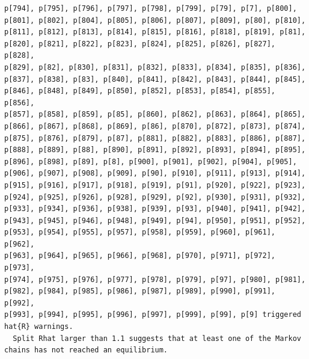 \documentclass[
  letterpaper,
  DIV=11,
  numbers=noendperiod]{scrartcl}
\begin{document}
\begin{verbatim}
p[794], p[795], p[796], p[797], p[798], p[799], p[79], p[7], p[800],
p[801], p[802], p[804], p[805], p[806], p[807], p[809], p[80], p[810],
p[811], p[812], p[813], p[814], p[815], p[816], p[818], p[819], p[81],
p[820], p[821], p[822], p[823], p[824], p[825], p[826], p[827], p[828],
p[829], p[82], p[830], p[831], p[832], p[833], p[834], p[835], p[836],
p[837], p[838], p[83], p[840], p[841], p[842], p[843], p[844], p[845],
p[846], p[848], p[849], p[850], p[852], p[853], p[854], p[855], p[856],
p[857], p[858], p[859], p[85], p[860], p[862], p[863], p[864], p[865],
p[866], p[867], p[868], p[869], p[86], p[870], p[872], p[873], p[874],
p[875], p[876], p[879], p[87], p[881], p[882], p[883], p[886], p[887],
p[888], p[889], p[88], p[890], p[891], p[892], p[893], p[894], p[895],
p[896], p[898], p[89], p[8], p[900], p[901], p[902], p[904], p[905],
p[906], p[907], p[908], p[909], p[90], p[910], p[911], p[913], p[914],
p[915], p[916], p[917], p[918], p[919], p[91], p[920], p[922], p[923],
p[924], p[925], p[926], p[928], p[929], p[92], p[930], p[931], p[932],
p[933], p[934], p[936], p[938], p[939], p[93], p[940], p[941], p[942],
p[943], p[945], p[946], p[948], p[949], p[94], p[950], p[951], p[952],
p[953], p[954], p[955], p[957], p[958], p[959], p[960], p[961], p[962],
p[963], p[964], p[965], p[966], p[968], p[970], p[971], p[972], p[973],
p[974], p[975], p[976], p[977], p[978], p[979], p[97], p[980], p[981],
p[982], p[984], p[985], p[986], p[987], p[989], p[990], p[991], p[992],
p[993], p[994], p[995], p[996], p[997], p[999], p[99], p[9] triggered
hat{R} warnings.
  Split Rhat larger than 1.1 suggests that at least one of the Markov
chains has not reached an equilibrium.
 

\end{verbatim}
\end{document}
